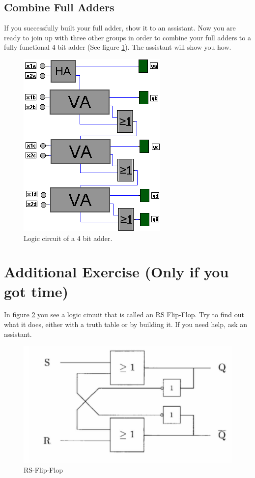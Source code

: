 \documentclass[10pt,a4paper]{article}
\begin{document}
\subsection{Combine Full Adders}
If you successfully built your full adder, show it to an assistant. Now you are ready to join up with three other groups in order to combine your full adders to a fully functional 4 bit adder (See figure \ref{fig:4bit}). The assistant will show you how.
\begin{figure}[H]
	\centering		  
	\includegraphics[scale=0.3]{4bit.png}
	\caption{Logic circuit of a 4 bit adder.}
	\label{fig:4bit}
\end{figure}


\section{Additional Exercise (Only if you got time)}
In figure \ref{fig:RSFF} you see a logic circuit that is called an RS Flip-Flop. Try to find out what it does, either with a truth table or by building it. If you need help, ask an assistant.

\begin{figure}[H]
	\centering
	\includegraphics[height=0.35\textwidth]{RSFF}%
	\caption{RS-Flip-Flop}%
	\label{fig:RSFF}
\end{figure}
\end{document}
